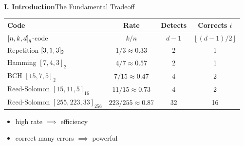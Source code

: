 \begin{frame}{\textbf{I. Introduction}}{The Fundamental Tradeoff}\small
\begin{center}\renewcommand{\arraystretch}{1.25}
\begin{tabular}{l|ccc}
	\textbf{Code} & \textbf{Rate} & \textbf{Detects} & \textbf{Corrects} $t$\\\hline
	$[n,k,d]_{q}$-code & $k/n$&  $d-1$ & $\left\lfloor(d-1)/2\right\rfloor$\\\hline
	Repetition $[3,1,3]_{2}$ & $1/3\approx0.33$ & 2 & 1 \\
	Hamming $[7,4,3]_2$ & $4/7\approx 0.57$ & 2 & 1 \\
	BCH $[15,7,5]_2$ & $7/15\approx 0.47$ & 4 & 2 \\
	Reed-Solomon $[15,11,5]_{16}$ & $11/15\approx 0.73$ & 4 & 2 \\
	Reed-Solomon $[255,223,33]_{256}$ & $223/255\approx 0.87$ & 32 & 16 \\
\end{tabular}
\end{center}
\begin{itemize}
	\item high rate $\implies$ efficiency
	\item correct many errors $\implies$ powerful
\end{itemize}

\end{frame}
